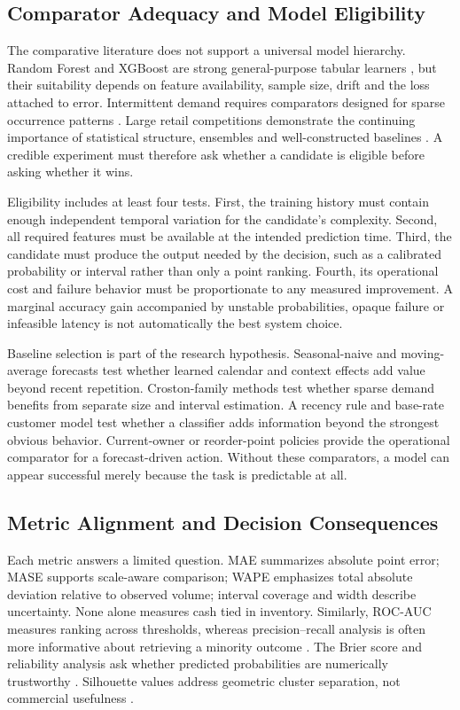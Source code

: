 \subsection{Comparator Adequacy and Model Eligibility}

The comparative literature does not support a universal model hierarchy.
Random Forest and XGBoost are strong general-purpose tabular learners
\cite{breiman2001rf,chen2016xgboost}, but their suitability depends on feature
availability, sample size, drift and the loss attached to error. Intermittent
demand requires comparators designed for sparse occurrence patterns
\cite{croston1972intermittent,syntetos2005intermittent}. Large retail
competitions demonstrate the continuing importance of statistical structure,
ensembles and well-constructed baselines \cite{makridakis2022m5}. A credible
experiment must therefore ask whether a candidate is eligible before asking
whether it wins.

Eligibility includes at least four tests. First, the training history must
contain enough independent temporal variation for the candidate's complexity.
Second, all required features must be available at the intended prediction
time. Third, the candidate must produce the output needed by the decision, such
as a calibrated probability or interval rather than only a point ranking.
Fourth, its operational cost and failure behavior must be proportionate to any
measured improvement. A marginal accuracy gain accompanied by unstable
probabilities, opaque failure or infeasible latency is not automatically the
best system choice.

Baseline selection is part of the research hypothesis. Seasonal-naive and
moving-average forecasts test whether learned calendar and context effects add
value beyond recent repetition. Croston-family methods test whether sparse
demand benefits from separate size and interval estimation. A recency rule and
base-rate customer model test whether a classifier adds information beyond the
strongest obvious behavior. Current-owner or reorder-point policies provide the
operational comparator for a forecast-driven action. Without these comparators,
a model can appear successful merely because the task is predictable at all.

\subsection{Metric Alignment and Decision Consequences}

Each metric answers a limited question. MAE summarizes absolute point error;
MASE supports scale-aware comparison; WAPE emphasizes total absolute deviation
relative to observed volume; interval coverage and width describe uncertainty.
None alone measures cash tied in inventory. Similarly, ROC-AUC measures ranking
across thresholds, whereas precision--recall analysis is often more informative
about retrieving a minority outcome \cite{saito2015pr}. The Brier score and
reliability analysis ask whether predicted probabilities are numerically
trustworthy \cite{niculescu2005calibration}. Silhouette values address geometric
cluster separation, not commercial usefulness \cite{rousseeuw1987silhouettes}.

